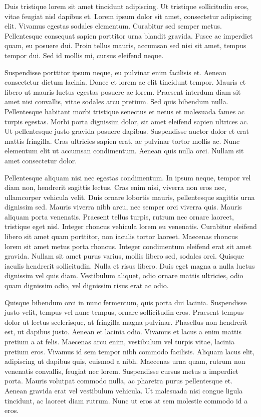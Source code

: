 \documentclass[2pt,a4paper,twoside ]{article}
\begin{document}
\begin{multicols}{2}
Duis tristique lorem sit amet tincidunt adipiscing. Ut tristique sollicitudin eros, vitae feugiat nisl dapibus et. Lorem ipsum dolor sit amet, consectetur adipiscing elit. Vivamus egestas sodales elementum. Curabitur sed semper metus. Pellentesque consequat sapien porttitor urna blandit gravida. Fusce ac imperdiet quam, eu posuere dui. Proin tellus mauris, accumsan sed nisi sit amet, tempus tempor dui. Sed id mollis mi, cursus eleifend neque.

Suspendisse porttitor ipsum neque, eu pulvinar enim facilisis et. Aenean consectetur dictum lacinia. Donec et lorem ac elit tincidunt tempor. Mauris et libero ut mauris luctus egestas posuere ac lorem. Praesent interdum diam sit amet nisi convallis, vitae sodales arcu pretium. Sed quis bibendum nulla. Pellentesque habitant morbi tristique senectus et netus et malesuada fames ac turpis egestas. Morbi porta dignissim dolor, sit amet eleifend sapien ultrices ac. Ut pellentesque justo gravida posuere dapibus. Suspendisse auctor dolor et erat mattis fringilla. Cras ultricies sapien erat, ac pulvinar tortor mollis ac. Nunc elementum elit ut accumsan condimentum. Aenean quis nulla orci. Nullam sit amet consectetur dolor.

Pellentesque aliquam nisi nec egestas condimentum. In ipsum neque, tempor vel diam non, hendrerit sagittis lectus. Cras enim nisi, viverra non eros nec, ullamcorper vehicula velit. Duis ornare lobortis mauris, pellentesque sagittis urna dignissim sed. Mauris viverra nibh arcu, nec semper orci viverra quis. Mauris aliquam porta venenatis. Praesent tellus turpis, rutrum nec ornare laoreet, tristique eget nisl. Integer rhoncus vehicula lorem eu venenatis. Curabitur eleifend libero sit amet quam porttitor, non iaculis tortor laoreet. Maecenas rhoncus lorem sit amet metus porta rhoncus. Integer condimentum eleifend erat sit amet gravida. Nullam sit amet purus varius, mollis libero sed, sodales orci. Quisque iaculis hendrerit sollicitudin. Nulla et risus libero. Duis eget magna a nulla luctus dignissim vel quis diam. Vestibulum aliquet, odio ornare mattis ultricies, odio quam dignissim odio, vel dignissim risus erat ac odio.

Quisque bibendum orci in nunc fermentum, quis porta dui lacinia. Suspendisse justo velit, tempus vel nunc tempus, ornare sollicitudin eros. Praesent tempus dolor ut lectus scelerisque, at fringilla magna pulvinar. Phasellus non hendrerit est, ut dapibus justo. Aenean et lacinia odio. Vivamus et lacus a enim mattis pretium a at felis. Maecenas arcu enim, vestibulum vel turpis vitae, lacinia pretium eros. Vivamus id sem tempor nibh commodo facilisis. Aliquam lacus elit, adipiscing ut dapibus quis, euismod a nibh. Maecenas urna quam, rutrum non venenatis convallis, feugiat nec lorem. Suspendisse cursus metus a imperdiet porta. Mauris volutpat commodo nulla, ac pharetra purus pellentesque et. Aenean gravida erat vel vestibulum vehicula. Ut malesuada nisi congue ligula tincidunt, ac laoreet diam rutrum. Nunc ut eros at sem molestie commodo id a eros.


\end{multicols}
\end{document}
